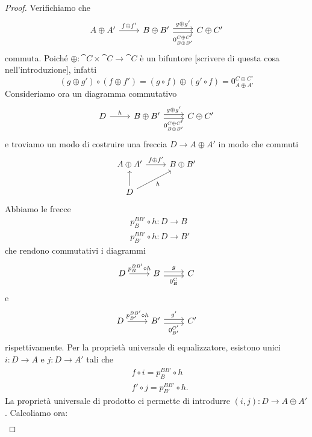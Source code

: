 \begin{proof}
  Verifichiamo che
  \[
    \begin{tikzcd}
      A \oplus A' \ar["{f \oplus f'}", r] & B \oplus B' \ar["{g \oplus
        g'}", r, shift left] \ar["{0_{B \oplus B'}^{C \oplus C'}}", r,
      shift right, swap] & C \oplus C'
    \end{tikzcd}
  \]
  commuta. Poiché \(\oplus : \cat C \times \cat C \to \cat C\) è un
  bifuntore {\color{red} [scrivere di questa cosa nell'introduzione]},
  infatti
  \[
    (g \oplus g') \circ (f \oplus f') = (g \circ f) \oplus (g' \circ f)
    = 0_{A \oplus A'}^{C \oplus C'}
  \]
  Consideriamo ora un diagramma commutativo
  \[
    \begin{tikzcd}
      D \ar["{h}", r] & B \oplus B' \ar["{g \oplus g'}", r, shift left]
      \ar["{0_{B \oplus B'}^{C \oplus C'}}", r, shift right, swap] & C
      \oplus C'
    \end{tikzcd}
  \]
  e troviamo un modo di costruire una freccia \(D \to A \oplus A'\) in
  modo che commuti
  \[
    \begin{tikzcd}
      A \oplus A' \ar["{f \oplus f'}", r] & B \oplus B' \\
      D \ar["{h}", ur, swap] \ar["{}", u]
    \end{tikzcd}
  \]
  Abbiamo le frecce
  \begin{align*}
    & p_B^{BB'} \circ h : D \to B \\
    & p_{B'}^{BB'}\circ h : D \to B'
  \end{align*}
  che rendono commutativi i diagrammi
  \[
    \begin{tikzcd}
      D \ar["{p_B^{BB'} \circ h}", r] & B \ar["{g}", r, shift left]
      \ar["{0_B^C}", r, shift right, swap] & C
    \end{tikzcd}
  \]
  e
  \[
    \begin{tikzcd}
      D \ar["{p_{B'}^{BB'} \circ h}", r] & B' \ar["{g'}", r, shift left]
      \ar["{0_{B'}^{C'}}", r, shift right, swap] & C'
    \end{tikzcd}
  \]
  rispettivamente. Per la proprietà universale di equalizzatore,
  esistono unici \(i : D \to A\) e \(j : D \to A'\) tali che
  \begin{align*}
    & f \circ i = p_B^{BB'} \circ h \\
    & f' \circ j = p_{B'}^{BB'} \circ h .
  \end{align*}
  La proprietà universale di prodotto ci permette di introdurre
  \((i,j) : D \to A \oplus A'\).  Calcoliamo ora:
  \begin{align*}

\end{align*}
\end{proof}
